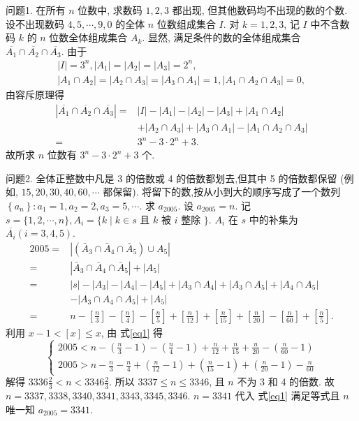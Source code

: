 
问题1. 在所有 $n$ 位数中, 求数码 $1,2,3$ 都出现, 但其他数码均不出现的数的个数.
设不出现数码 $4,5, \cdots, 9,0$ 的全体 $n$ 位数组成集合 $I$.
对 $k=1,2,3$, 记 $I$ 中不含数码 $k$ 的 $n$ 位数全体组成集合 $A_k$. 显然, 满足条件的数的全体组成集合 $\overline{A_1} \cap \overline{A_2} \cap \overline{A_3}$.
由于
$$
\begin{gathered}
|I|=3^n,\left|A_1\right|=\left|A_2\right|=\left|A_3\right|=2^n, \\
\left|A_1 \cap A_2\right|=\left|A_2 \cap A_3\right|=\left|A_3 \cap A_1\right|=1,\left|A_1 \cap A_2 \cap A_3\right|=0,
\end{gathered}
$$
由容斥原理得
$$
\begin{aligned}
\left|\overline{A_1} \cap \overline{A_2} \cap \overline{A_3}\right|= & |I|-\left|A_1\right|-\left|A_2\right|-\left|A_3\right|+\left|A_1 \cap A_2\right| \\
& +\left|A_2 \cap A_3\right|+\left|A_3 \cap A_1\right|-\left|A_1 \cap A_2 \cap A_3\right| \\
= & 3^n-3 \cdot 2^n+3 .
\end{aligned}
$$
故所求 $n$ 位数有 $3^n-3 \cdot 2^n+3$ 个.



问题2. 全体正整数中凡是 3 的倍数或 4 的倍数都划去,但其中 5 的倍数都保留 (例如, $15,20,30,40,60, \cdots$ 都保留). 将留下的数,按从小到大的顺序写成了一个数列 $\left\{a_n\right\}: a_1=1, a_2=2, a_3=5, \cdots$. 求 $a_{2005}$.
设 $a_{2005}=n$. 记 $s=\{1,2, \cdots, n\}, A_i=\{k \mid k \in s$ 且 $k$ 被 $i$ 整除 $\}$.
$A_i$ 在 $s$ 中的补集为 $\overline{A_i}(i=3,4,5)$.
$$
\begin{aligned}
2005= & \left|\left(\bar{A}_3 \cap \bar{A}_4 \cap \bar{A}_5\right) \cup A_5\right| \\
= & \left|\bar{A}_3 \cap \bar{A}_4 \cap \bar{A}_5\right|+\left|A_5\right| \\
= & |s|-\left|A_3\right|-\left|A_4\right|-\left|A_5\right|+\left|A_3 \cap A_4\right|+\left|A_3 \cap A_5\right|+\left|A_4 \cap A_5\right| \\
& -\left|A_3 \cap A_4 \cap A_5\right|+\left|A_5\right| \\
= & n-\left[\frac{n}{3}\right]-\left[\frac{n}{4}\right]-\left[\frac{n}{5}\right]+\left[\frac{n}{12}\right]+\left[\frac{n}{15}\right]+\left[\frac{n}{20}\right]-\left[\frac{n}{60}\right]+\left[\frac{n}{5}\right] . \label{eq1}
\end{aligned}
$$
利用 $x-1<[x] \leqslant x$, 由 式\ref{eq1} 得
$$
\left\{\begin{array}{l}
2005<n-\left(\frac{n}{3}-1\right)-\left(\frac{n}{4}-1\right)+\frac{n}{12}+\frac{n}{15}+\frac{n}{20}-\left(\frac{n}{60}-1\right) \\
2005>n-\frac{n}{3}-\frac{n}{4}+\left(\frac{n}{12}-1\right)+\left(\frac{n}{15}-1\right)+\left(\frac{n}{20}-1\right)-\frac{n}{60}
\end{array}\right.
$$
解得 $3336 \frac{2}{3}<n<3346 \frac{2}{3}$. 所以 $3337 \leqslant n \leqslant 3346$, 且 $n$ 不为 3 和 4 的倍数.
故 $n=3337,3338,3340,3341,3343,3345,3346$.
$n=3341$ 代入 式\ref{eq1} 满足等式且 $n$ 唯一知 $a_{2005}=3341$.



